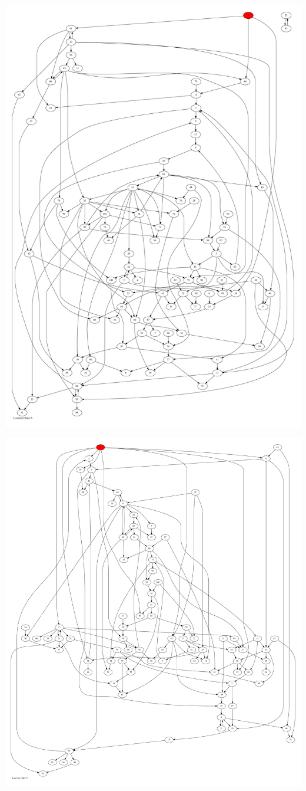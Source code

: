 \documentclass{article}
\begin{document}
\newpage
\includegraphics[max height=\textheight,max width=\textwidth]{looming_object/loom_obj6_pp.pdf}

\newpage
\includegraphics[max height=\textheight,max width=\textwidth]{looming_object/loom_obj7_pp.pdf}
\end{document}
